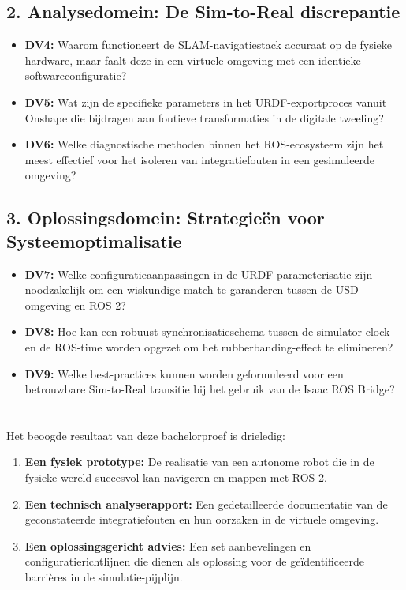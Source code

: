 \subsection*{2. Analysedomein: De Sim-to-Real discrepantie}
\begin{itemize}
    \item \textbf{DV4:} Waarom functioneert de SLAM-navigatiestack accuraat op de fysieke hardware, maar faalt deze in een virtuele omgeving met een identieke softwareconfiguratie?
    \item \textbf{DV5:} Wat zijn de specifieke parameters in het URDF-exportproces vanuit Onshape die bijdragen aan foutieve transformaties in de digitale tweeling?
    \item \textbf{DV6:} Welke diagnostische methoden binnen het ROS-ecosysteem zijn het meest effectief voor het isoleren van integratiefouten in een gesimuleerde omgeving?
\end{itemize}

\subsection*{3. Oplossingsdomein: Strategieën voor Systeemoptimalisatie}
\begin{itemize}
    \item \textbf{DV7:} Welke configuratieaanpassingen in de URDF-parameterisatie zijn noodzakelijk om een wiskundige match te garanderen tussen de USD-omgeving en ROS 2?
    \item \textbf{DV8:} Hoe kan een robuust synchronisatieschema tussen de simulator-clock en de ROS-time worden opgezet om het rubberbanding-effect te elimineren?
    \item \textbf{DV9:} Welke best-practices kunnen worden geformuleerd voor een betrouwbare Sim-to-Real transitie bij het gebruik van de Isaac ROS Bridge?
\end{itemize}

\section{}%
\label{sec:onderzoeksdoelstelling}

Het beoogde resultaat van deze bachelorproef is drieledig:
\begin{enumerate}
    \item \textbf{Een fysiek prototype:} De realisatie van een autonome robot die in de fysieke wereld succesvol kan navigeren en mappen met ROS 2.
    \item \textbf{Een technisch analyserapport:} Een gedetailleerde documentatie van de geconstateerde integratiefouten en hun oorzaken in de virtuele omgeving.
    \item \textbf{Een oplossingsgericht advies:} Een set aanbevelingen en configuratierichtlijnen die dienen als oplossing voor de geïdentificeerde barrières in de simulatie-pijplijn.
\end{enumerate}

